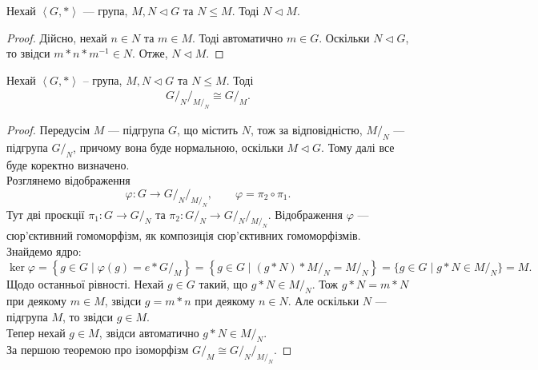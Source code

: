\documentclass{math_library}
\begin{document}
\begin{lemma}
Нехай $\left< G, *\right>$ --- група, $M,N \triangleleft G$ та $N \leq M$. Тоді $N \triangleleft M$.
\end{lemma}

\begin{proof}
Дійсно, нехай $n \in N$ та $m \in M$. Тоді автоматично $m \in G$. Оскільки $N \triangleleft G$, то звідси $m*n*m^{-1} \in N$. Отже, $N \triangleleft M$.
\end{proof}

\begin{theorem}
Нехай $\left< G, *\right>$ -- група, $M,N \triangleleft G$ та $N \leq M$. Тоді
\begin{align*}
{G/_N}/_{M/_N} \cong G/_M.
\end{align*}
\end{theorem}

\begin{proof}
Передусім $M$ --- підгрупа $G$, що містить $N$, тож за відповідністю, $M/_N$ --- підгрупа $G/_N$, причому вона буде нормальною, оскільки $M \triangleleft G$. Тому далі все буде коректно визначено.\\
Розглянемо відображення 
\[
\varphi \colon G \to {G/_N}/_{M/_N}, \qquad \varphi = \pi_2 \circ \pi_1. 
\]
Тут дві проєкції $\pi_1 \colon G \to G/_N$ та $\pi_2 \colon G/_N \to {G/_N}/_{M/_N}$. Відображення $\varphi$ --- сюр'єктивний гомоморфізм, як композиція сюр'єктивних гомоморфізмів. Знайдемо ядро:
\[
\ker \varphi = \left\{g \in G \mid \varphi(g) = e*G/_M \right\} = \left\{ g \in G \mid (g*N)*M/_N = M/_N \right\} = \{g \in G \mid g*N \in M/_N\} = M.
\]
Щодо останньої рівності. Нехай $g \in G$ такий, що $g*N \in M/_N$. Тож $g*N = m*N$ при деякому $m \in M$, звідси $g = m*n$ при деякому $n \in N$. Але оскільки $N$ --- підгрупа $M$, то звідси $g \in M$.\\
Тепер нехай $g \in M$, звідси автоматично $g*N \in M/_N$.\\
За першою теоремою про ізоморфізм $G/_M \cong {G/_N}/_{M/_N}$.
\end{proof}
\end{document}

